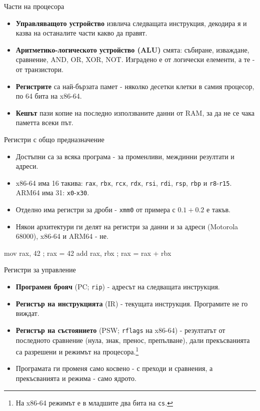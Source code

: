 \documentclass[14pt, aspectratio=169]{beamer}
\begin{document}
\begin{frame}{Части на процесора}
  \begin{itemize}
    \item \textbf{Управляващото устройство} извлича следващата инструкция,
      декодира я и казва на останалите части какво да правят.
    \item \textbf{Аритметико-логическото устройство (ALU)} смята: събиране,
      изваждане, сравнение, AND, OR, XOR, NOT. Изградено е от логически
      елементи, а те - от транзистори.
    \item \textbf{Регистрите} са най-бързата памет - няколко десетки клетки в
      самия процесор, по 64 бита на x86-64.
    \item \textbf{Кешът} пази копие на последно използваните данни от RAM, за
      да не се чака паметта всеки път.
  \end{itemize}
\end{frame}

\begin{frame}[fragile]{Регистри с общо предназначение}
  \begin{itemize}
    \item Достъпни са за всяка програма - за променливи, междинни резултати
      и адреси.
    \item x86-64 има 16 такива: \texttt{rax}, \texttt{rbx}, \texttt{rcx},
      \texttt{rdx}, \texttt{rsi}, \texttt{rdi}, \texttt{rsp}, \texttt{rbp} и
      \texttt{r8}-\texttt{r15}. ARM64 има 31: \texttt{x0}-\texttt{x30}.
    \item Отделно има регистри за дроби - \texttt{xmm0} от примера с
      $0.1 + 0.2$ е такъв.
    \item Някои архитектури ги делят на регистри за данни и за адреси
      (Motorola 68000), x86-64 и ARM64 - не.
  \end{itemize}
\begin{semiverbatim}\small
    mov rax, 42      ; rax = 42
    add rax, rbx     ; rax = rax + rbx
\end{semiverbatim}
\end{frame}

\begin{frame}{Регистри за управление}
  \begin{itemize}
    \item \textbf{Програмен брояч} (PC; \texttt{rip}) - адресът на следващата
      инструкция.
    \item \textbf{Регистър на инструкцията} (IR) - текущата инструкция.
      Програмите не го виждат.
    \item \textbf{Регистър на състоянието} (PSW; \texttt{rflags} на x86-64) -
      резултатът от последното сравнение (нула, знак, пренос, препълване),
      дали прекъсванията са разрешени и режимът на
      процесора.\footnote{На x86-64 режимът е в младшите два бита на
        \texttt{cs}.}
    \item Програмата ги променя само косвено - с преходи и сравнения, а
      прекъсванията и режима - само ядрото.
  \end{itemize}
\end{frame}
\end{document}
